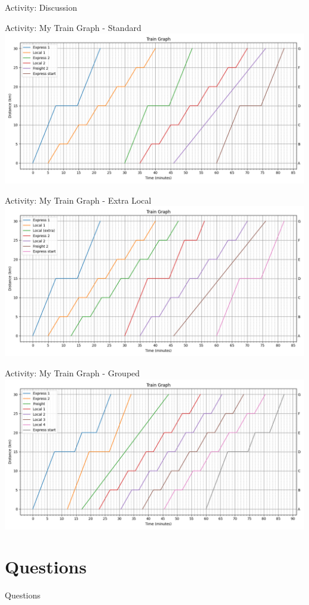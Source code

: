 \documentclass[
    aspectratio=169
]{beamer}
\begin{document}
\begin{frame}{Activity: Discussion}
	
\end{frame}

\begin{frame}{Activity: My Train Graph - Standard}
	\includegraphics[width=\textwidth]{../train-generator/output/activity-even.png}
\end{frame}

\begin{frame}{Activity: My Train Graph - Extra Local}
	\includegraphics[width=\textwidth]{../train-generator/output/activity-even-extra.png}
\end{frame}

\begin{frame}{Activity: My Train Graph - Grouped}
	\includegraphics[width=\textwidth]{../train-generator/output/activity-grouped.png}
\end{frame}

\section{Questions}

\begin{frame}{Questions}
	
\end{frame}
\end{document}
